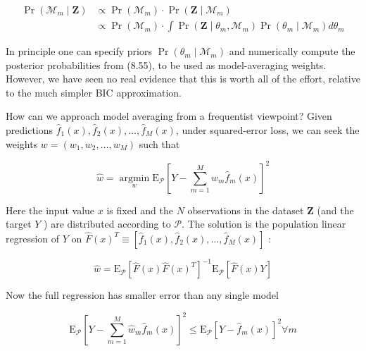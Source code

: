 \documentclass[10pt]{article}
\begin{document}
\begin{align*}
\operatorname{Pr}\left(\mathcal{M}_{m} \mid \mathbf{Z}\right) & \propto \operatorname{Pr}\left(\mathcal{M}_{m}\right) \cdot \operatorname{Pr}\left(\mathbf{Z} \mid \mathcal{M}_{m}\right) \\
& \propto \operatorname{Pr}\left(\mathcal{M}_{m}\right) \cdot \int \operatorname{Pr}\left(\mathbf{Z} \mid \theta_{m}, \mathcal{M}_{m}\right) \operatorname{Pr}\left(\theta_{m} \mid \mathcal{M}_{m}\right) d \theta_{m} \tag{8.55}
\end{align*}


In principle one can specify priors $\operatorname{Pr}\left(\theta_{m} \mid \mathcal{M}_{m}\right)$ and numerically compute the posterior probabilities from (8.55), to be used as model-averaging weights. However, we have seen no real evidence that this is worth all of the effort, relative to the much simpler BIC approximation.

How can we approach model averaging from a frequentist viewpoint? Given predictions $\hat{f}_{1}(x), \hat{f}_{2}(x), \ldots, \hat{f}_{M}(x)$, under squared-error loss, we can seek the weights $w=\left(w_{1}, w_{2}, \ldots, w_{M}\right)$ such that


\begin{equation*}
\hat{w}=\underset{w}{\operatorname{argmin}} \mathrm{E}_{\mathcal{P}}\left[Y-\sum_{m=1}^{M} w_{m} \hat{f}_{m}(x)\right]^{2} \tag{8.56}
\end{equation*}


Here the input value $x$ is fixed and the $N$ observations in the dataset $\mathbf{Z}$ (and the target $Y$ ) are distributed according to $\mathcal{P}$. The solution is the population linear regression of $Y$ on $\hat{F}(x)^{T} \equiv\left[\hat{f}_{1}(x), \hat{f}_{2}(x), \ldots, \hat{f}_{M}(x)\right]$ :


\begin{equation*}
\hat{w}=\mathrm{E}_{\mathcal{P}}\left[\hat{F}(x) \hat{F}(x)^{T}\right]^{-1} \mathrm{E}_{\mathcal{P}}[\hat{F}(x) Y] \tag{8.57}
\end{equation*}


Now the full regression has smaller error than any single model


\begin{equation*}
\mathrm{E}_{\mathcal{P}}\left[Y-\sum_{m=1}^{M} \hat{w}_{m} \hat{f}_{m}(x)\right]^{2} \leq \mathrm{E}_{\mathcal{P}}\left[Y-\hat{f}_{m}(x)\right]^{2} \forall m \tag{8.58}
\end{equation*}
\end{document}

